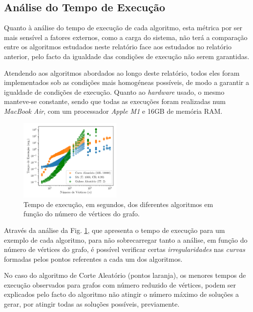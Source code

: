 \documentclass[mirror, portugues]{revdetua}
\begin{document}
\subsection{Análise do Tempo de Execução}

Quanto à análise do tempo de execução de cada algoritmo, esta métrica por ser mais sensível a fatores externos, como a carga do sistema, não terá a comparação entre os algoritmos estudados neste relatório face aos estudados no relatório anterior, pelo facto da igualdade das condições de execução não serem garantidas.

Atendendo aos algoritmos abordados ao longo deste relatório, todos eles foram implementados sob as condições mais homogéneas possíveis, de modo a garantir a igualdade de condições de execução. Quanto ao \textit{hardware} usado, o mesmo manteve-se constante, sendo que todas as execuções foram realizadas num \textit{MacBook Air}, com um processador \textit{Apple M1} e 16GB de memória RAM.


\begin{figure}[H]
    \centering
    \includegraphics[width=0.45\textwidth]{../assets/time_all.png}
    \caption{Tempo de execução, em segundos, dos diferentes algoritmos em função do número de vértices do grafo.}
    \label{fig:time_all}
\end{figure}

Através da análise da Fig. \ref{fig:time_all}, que apresenta o tempo de execução para um exemplo de cada algoritmo, para não sobrecarregar tanto a análise, em função do número de vértices do grafo, é possível verificar certas \textit{irregularidades} nas \textit{curvas} formadas pelos pontos referentes a cada um dos algoritmos.

No caso do algoritmo de Corte Aleatório (pontos laranja), os menores tempos de execução observados para grafos com número reduzido de vértices, podem ser explicados pelo facto do algoritmo não atingir o número máximo de soluções a gerar, por atingir todas as soluções possíveis, previamente.
\end{document}
